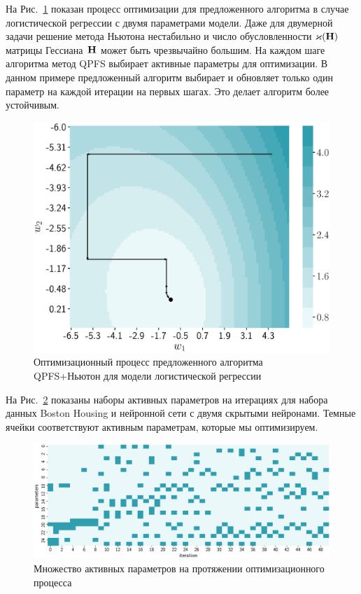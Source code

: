На Рис.~\ref{ch3:fig:irls_qpfs_2d} показан процесс оптимизации для предложенного алгоритма в случае логистической регрессии с двумя параметрами модели. 
Даже для двумерной задачи решение метода Ньютона нестабильно и число обусловленности $\varkappa(\mathbf{H})$ матрицы Гессиана~$\mathbf{H}$ может быть чрезвычайно большим. 
На каждом шаге алгоритма метод QPFS выбирает активные параметры для оптимизации. 
В данном примере предложенный алгоритм выбирает и обновляет только один параметр на каждой итерации на первых шагах. 
Это делает алгоритм более устойчивым.

\begin{figure}[!h]
	\centering
	\includegraphics[width=0.6\linewidth]{figs/ch3/irls_qpfs_2d}	 
	\caption{Оптимизационный процесс предложенного алгоритма QPFS+Ньютон для модели логистической регрессии}
	\label{ch3:fig:irls_qpfs_2d}
\end{figure}

На Рис.~\ref{ch3:fig:active_params_wrt_iters} показаны наборы активных параметров на итерациях для набора данных Boston Housing и нейронной сети с двумя скрытыми нейронами. 
Темные ячейки соответствуют активным параметрам, которые мы оптимизируем.
 
\begin{figure}[h]
	\centering
	\includegraphics[width=\linewidth]{figs/ch3/active_params_wrt_iters}	
	\caption{Множество активных параметров на протяжении оптимизационного процесса}
	\label{ch3:fig:active_params_wrt_iters}
\end{figure}

